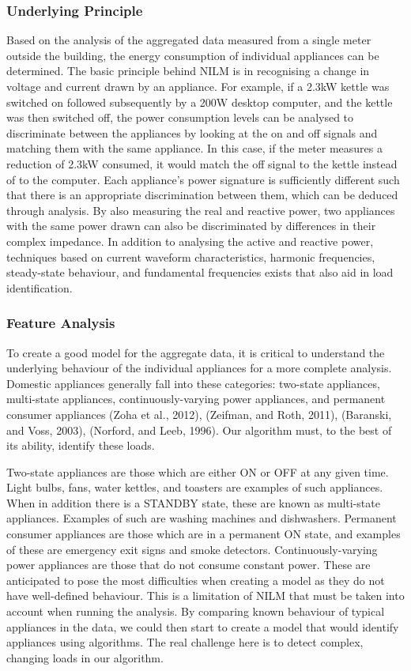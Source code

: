 \documentclass[12pt,twocolumn]{article}
\begin{document}
			\subsubsection*{Underlying Principle}
			\quad Based on the analysis of the aggregated data measured from a single meter outside the building, the energy consumption of individual appliances can be determined. The basic principle behind NILM is in recognising a change in voltage and current drawn by an appliance. For example, if a 2.3kW kettle was switched on followed subsequently by a 200W desktop computer, and the kettle was then switched off, the power consumption levels can be analysed to discriminate between the appliances by looking at the on and off signals and matching them with the same appliance. In this case, if the meter measures a reduction of 2.3kW consumed, it would match the off signal to the kettle instead of to the computer. Each appliance's power signature is sufficiently different such that there is an appropriate discrimination between them, which can be deduced through analysis. By also measuring the real and reactive power, two appliances with the same power drawn can also be discriminated by differences in their complex impedance. In addition to analysing the active and reactive power, techniques based on current waveform characteristics, harmonic frequencies, steady-state behaviour, and fundamental frequencies exists that also aid in load identification. 

			\subsubsection*{Feature Analysis}
			\quad To create a good model for the aggregate data, it is critical to understand the underlying behaviour of the individual appliances for a more complete analysis. Domestic appliances generally fall into these categories: two-state appliances, multi-state appliances, continuously-varying power appliances, and permanent consumer appliances (Zoha et al., 2012), (Zeifman, and Roth, 2011), (Baranski, and Voss, 2003), (Norford, and Leeb, 1996). Our algorithm must, to the best of its ability, identify these loads. \newline

			Two-state appliances are those which are either ON or OFF at any given time. Light bulbs, fans, water kettles, and toasters are examples of such appliances. When in addition there is a STANDBY state, these are known as multi-state appliances. Examples of such are washing machines and dishwashers. Permanent consumer appliances are those which are in a permanent ON state, and examples of these are emergency exit signs and smoke detectors. Continuously-varying power appliances are those that do not consume constant power. These are anticipated to pose the most difficulties when creating a model as they do not have well-defined behaviour. This is a limitation of NILM that must be taken into account when running the analysis. By comparing known behaviour of typical appliances in the data, we could then start to create a model that would identify appliances using algorithms. The real challenge here is to detect complex, changing loads in our algorithm. 
\end{document}
